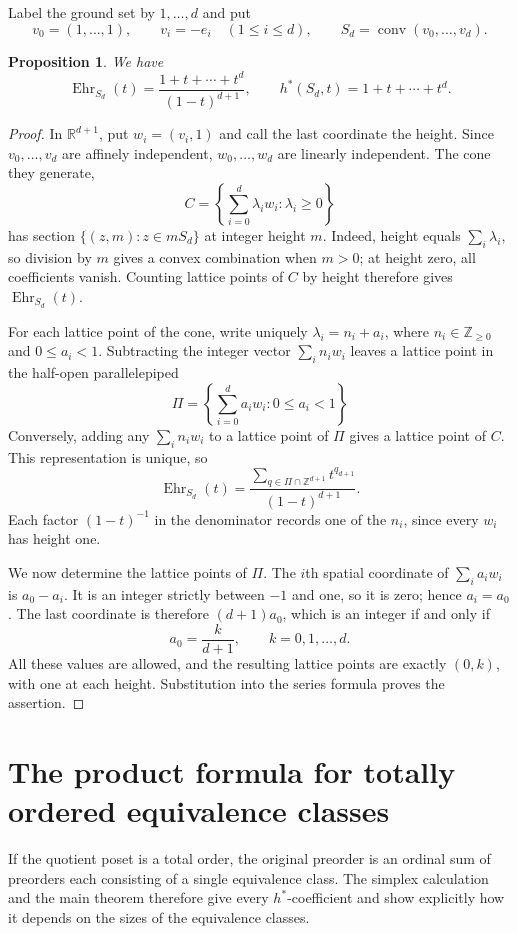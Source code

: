 \documentclass[11pt,reqno]{amsart}
\numberwithin{equation}{section}
\newtheorem{proposition}[theorem]{Proposition}
\theoremstyle{definition}
\theoremstyle{remark}
\theoremstyle{definition}
\DeclareMathOperator{\conv}{conv}
\DeclareMathOperator{\Ehr}{Ehr}
\begin{document}
Label the ground set by $1,\ldots,d$ and put
\[
 v_0=(1,\ldots,1),\qquad v_i=-e_i\quad(1\le i\le d),
 \qquad S_d=\conv(v_0,\ldots,v_d).
\]
\begin{proposition}\label{equivalenceclass}
We have
\[
 \Ehr_{S_d}(t)=\frac{1+t+\cdots+t^d}{(1-t)^{d+1}},\qquad
 h^*(S_d,t)=1+t+\cdots+t^d.
\]
\end{proposition}
\begin{proof}
In $\mathbb R^{d+1}$, put $w_i=(v_i,1)$ and call the last coordinate the height. Since $v_0,\ldots,v_d$ are affinely independent, $w_0,\ldots,w_d$ are linearly independent. The cone they generate,
\[
 C=\left\{\sum_{i=0}^d\lambda_iw_i:\lambda_i\ge0\right\}
\]
has section $\{(z,m):z\in mS_d\}$ at integer height $m$. Indeed, height equals $\sum_i\lambda_i$, so division by $m$ gives a convex combination when $m>0$; at height zero, all coefficients vanish. Counting lattice points of $C$ by height therefore gives $\Ehr_{S_d}(t)$.

For each lattice point of the cone, write uniquely $\lambda_i=n_i+a_i$, where $n_i\in\mathbb Z_{\ge0}$ and $0\le a_i<1$. Subtracting the integer vector $\sum_i n_iw_i$ leaves a lattice point in the half-open parallelepiped
\[
 \Pi=\left\{\sum_{i=0}^d a_iw_i:0\le a_i<1\right\}
\]
Conversely, adding any $\sum_i n_iw_i$ to a lattice point of $\Pi$ gives a lattice point of $C$. This representation is unique, so
\[
 \Ehr_{S_d}(t)=\frac{\sum_{q\in\Pi\cap\mathbb Z^{d+1}}t^{q_{d+1}}}
 {(1-t)^{d+1}}.
\]
Each factor $(1-t)^{-1}$ in the denominator records one of the $n_i$, since every $w_i$ has height one.

We now determine the lattice points of $\Pi$. The $i$th spatial coordinate of $\sum_i a_iw_i$ is $a_0-a_i$. It is an integer strictly between $-1$ and one, so it is zero; hence $a_i=a_0$. The last coordinate is therefore $(d+1)a_0$, which is an integer if and only if
\[
 a_0=\frac{k}{d+1},\qquad k=0,1,\ldots,d.
\]
All these values are allowed, and the resulting lattice points are exactly $(0,k)$, with one at each height. Substitution into the series formula proves the assertion.
\end{proof}

\section{The product formula for totally ordered equivalence classes}\label{app:equivalence}
If the quotient poset is a total order, the original preorder is an ordinal sum of preorders each consisting of a single equivalence class. The simplex calculation and the main theorem therefore give every $h^*$-coefficient and show explicitly how it depends on the sizes of the equivalence classes.
\end{document}
